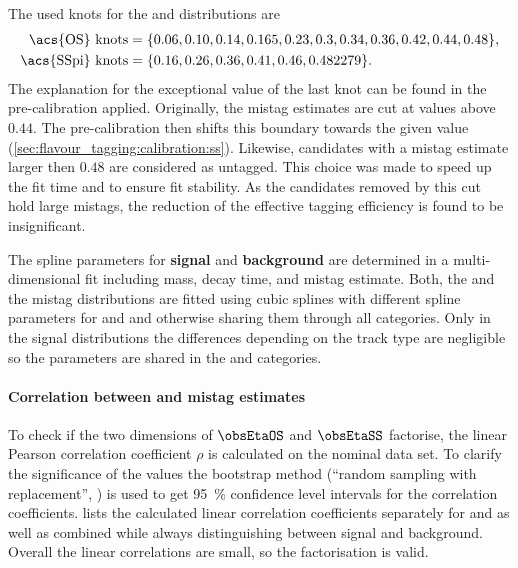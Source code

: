 The used knots for the \obsEtaOS and \obsEtaSS distributions are
%
\begin{equation*}
\begin{split}
  \text{\acs{OS} knots} &= \{0.06, 0.10, 0.14, 0.165, 0.23, 0.3, 0.34, 0.36, 0.42, 0.44, 0.48\} , \\
  \text{\acs{SSpi} knots} &= \{0.16, 0.26, 0.36, 0.41, 0.46, 0.482279\} .
\end{split}
\end{equation*}
%
The explanation for the exceptional value of the last \SSpi knot can be found in
the pre-calibration applied. Originally, the \SSpi mistag estimates are cut at
values above $\num{0.44}$. The pre-calibration then shifts this boundary towards
the given value (\cref{sec:flavour_tagging:calibration:ss}). Likewise,
\OS candidates with a mistag estimate larger then $\num{0.48}$ are considered as
\OS untagged. This choice was made to speed up the fit time and to ensure fit
stability. As the candidates removed by this cut hold large mistags, the
reduction of the effective tagging efficiency is found to be insignificant.

The spline parameters for \textbf{signal} and \textbf{background} are determined
in a multi-dimensional fit including mass, decay time, and mistag estimate.
Both, the \OS and the \SSpi mistag distributions are fitted using cubic splines
with different spline parameters for \catDD and \catLL and otherwise sharing
them through all categories. Only in the signal \OS distributions the
differences depending on the track type are negligible so the parameters are
shared in the \catDD and \catLL categories.

\paragraph{Correlation between \OS and \SSpi mistag estimates}

To check if the two dimensions of $\obsEtaOS$ and $\obsEtaSS$ factorise, the
linear Pearson correlation coefficient $\rho$ is calculated on the \sweighted
nominal data set. To clarify the significance of the values the bootstrap method
(\ie \enquote{random sampling with replacement}, \cf \eg \cite{Behnke:2013pga})
is used to get \SI{95}{\percent} confidence level intervals for the correlation
coefficients. 
lists the calculated linear correlation coefficients separately for \catDD and
\catLL as well as combined while always distinguishing between signal and
background. Overall the linear correlations are small, so the factorisation is
valid.

